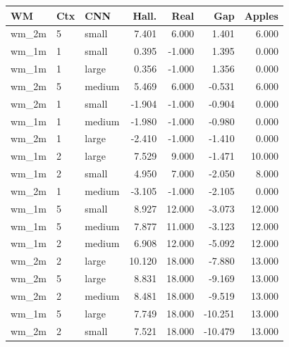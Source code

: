 \begin{tabular}{lllrrrr}
\toprule
WM & Ctx & CNN & Hall. & Real & Gap & Apples \\
\midrule
wm\_2m & 5 & small & 7.401 & 6.000 & 1.401 & 6.000 \\
wm\_1m & 1 & small & 0.395 & -1.000 & 1.395 & 0.000 \\
wm\_1m & 1 & large & 0.356 & -1.000 & 1.356 & 0.000 \\
wm\_2m & 5 & medium & 5.469 & 6.000 & -0.531 & 6.000 \\
wm\_2m & 1 & small & -1.904 & -1.000 & -0.904 & 0.000 \\
wm\_1m & 1 & medium & -1.980 & -1.000 & -0.980 & 0.000 \\
wm\_2m & 1 & large & -2.410 & -1.000 & -1.410 & 0.000 \\
wm\_1m & 2 & large & 7.529 & 9.000 & -1.471 & 10.000 \\
wm\_1m & 2 & small & 4.950 & 7.000 & -2.050 & 8.000 \\
wm\_2m & 1 & medium & -3.105 & -1.000 & -2.105 & 0.000 \\
wm\_1m & 5 & small & 8.927 & 12.000 & -3.073 & 12.000 \\
wm\_1m & 5 & medium & 7.877 & 11.000 & -3.123 & 12.000 \\
wm\_1m & 2 & medium & 6.908 & 12.000 & -5.092 & 12.000 \\
wm\_2m & 2 & large & 10.120 & 18.000 & -7.880 & 13.000 \\
wm\_2m & 5 & large & 8.831 & 18.000 & -9.169 & 13.000 \\
wm\_2m & 2 & medium & 8.481 & 18.000 & -9.519 & 13.000 \\
wm\_1m & 5 & large & 7.749 & 18.000 & -10.251 & 13.000 \\
wm\_2m & 2 & small & 7.521 & 18.000 & -10.479 & 13.000 \\
\bottomrule
\end{tabular}

